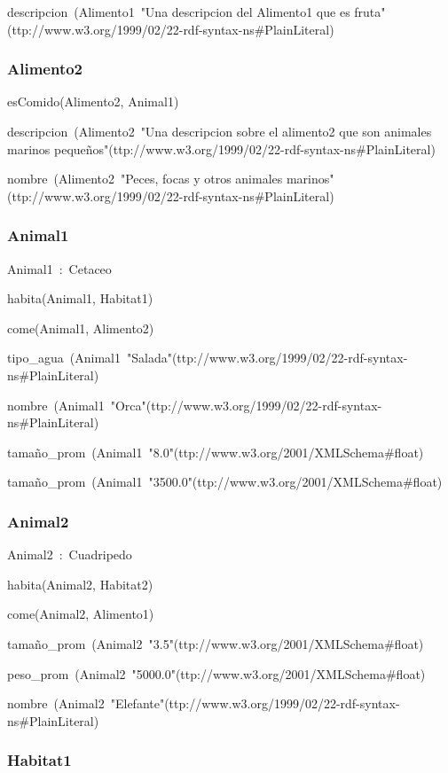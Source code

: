 descripcion~(Alimento1~"Una descripcion del Alimento1 que es fruta"^^http://www.w3.org/1999/02/22-rdf-syntax-ns\#PlainLiteral)

\subsubsection*{Alimento2}

esComido(Alimento2, Animal1)

descripcion~(Alimento2~"Una descripcion sobre el alimento2 que son animales marinos pequeños"^^http://www.w3.org/1999/02/22-rdf-syntax-ns\#PlainLiteral)

nombre~(Alimento2~"Peces, focas y otros animales marinos"^^http://www.w3.org/1999/02/22-rdf-syntax-ns\#PlainLiteral)

\subsubsection*{Animal1}

Animal1~:~Cetaceo

habita(Animal1, Habitat1)

come(Animal1, Alimento2)

tipo\_agua~(Animal1~"Salada"^^http://www.w3.org/1999/02/22-rdf-syntax-ns\#PlainLiteral)

nombre~(Animal1~"Orca"^^http://www.w3.org/1999/02/22-rdf-syntax-ns\#PlainLiteral)

tamaño\_prom~(Animal1~"8.0"^^http://www.w3.org/2001/XMLSchema\#float)

tamaño\_prom~(Animal1~"3500.0"^^http://www.w3.org/2001/XMLSchema\#float)

\subsubsection*{Animal2}

Animal2~:~Cuadripedo

habita(Animal2, Habitat2)

come(Animal2, Alimento1)

tamaño\_prom~(Animal2~"3.5"^^http://www.w3.org/2001/XMLSchema\#float)

peso\_prom~(Animal2~"5000.0"^^http://www.w3.org/2001/XMLSchema\#float)

nombre~(Animal2~"Elefante"^^http://www.w3.org/1999/02/22-rdf-syntax-ns\#PlainLiteral)

\subsubsection*{Habitat1}

